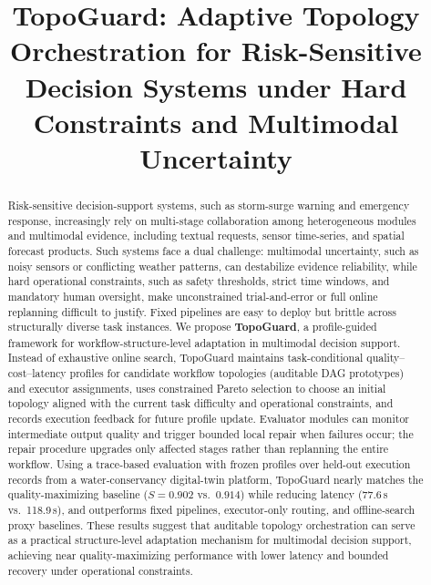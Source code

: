 \documentclass[acmsmall,review,anonymous]{acmart}
\begin{document}
\title{TopoGuard: Adaptive Topology Orchestration for Risk-Sensitive Decision Systems under Hard Constraints and Multimodal Uncertainty}



\begin{abstract}
Risk-sensitive decision-support systems, such as storm-surge warning and emergency response, increasingly rely on multi-stage collaboration among heterogeneous modules and multimodal evidence, including textual requests, sensor time-series, and spatial forecast products. Such systems face a dual challenge: multimodal uncertainty, such as noisy sensors or conflicting weather patterns, can destabilize evidence reliability, while hard operational constraints, such as safety thresholds, strict time windows, and mandatory human oversight, make unconstrained trial-and-error or full online replanning difficult to justify. Fixed pipelines are easy to deploy but brittle across structurally diverse task instances. We propose \textbf{TopoGuard}, a profile-guided framework for workflow-structure-level adaptation in multimodal decision support. Instead of exhaustive online search, TopoGuard maintains task-conditional quality--cost--latency profiles for candidate workflow topologies (auditable DAG prototypes) and executor assignments, uses constrained Pareto selection to choose an initial topology aligned with the current task difficulty and operational constraints, and records execution feedback for future profile update. Evaluator modules can monitor intermediate output quality and trigger bounded local repair when failures occur; the repair procedure upgrades only affected stages rather than replanning the entire workflow. Using a trace-based evaluation with frozen profiles over held-out execution records from a water-conservancy digital-twin platform, TopoGuard nearly matches the quality-maximizing baseline ($S=0.902$ vs.\ $0.914$) while reducing latency (77.6\,s vs.\ 118.9\,s), and outperforms fixed pipelines, executor-only routing, and offline-search proxy baselines. These results suggest that auditable topology orchestration can serve as a practical structure-level adaptation mechanism for multimodal decision support, achieving near quality-maximizing performance with lower latency and bounded recovery under operational constraints.
\end{abstract}
\end{document}
